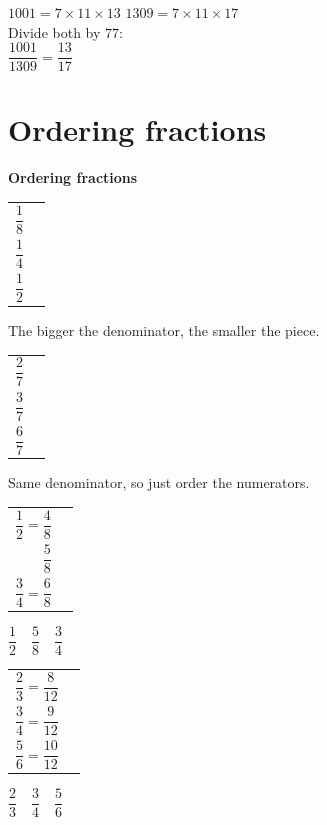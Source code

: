\documentclass[aspectratio=169]{beamer}
\makeatletter
\newcommand{\qtopic}[1]{%
  \section{#1}%
  \begin{frame}[plain]
    \vfill
    \begin{center}
      {\usebeamercolor[fg]{structure}\Huge\bfseries #1}
    \end{center}
    \vfill
  \end{frame}%
}
\newcommand{\barstack}[1]{%
  {\renewcommand{\arraystretch}{1.2}%
   \begin{tabular}{@{}r@{\;\;}l@{}}#1\end{tabular}}%
}
\makeatother
\begin{document}
  {$1001=7\times 11\times 13$ \qquad $1309=7\times 11\times 17$\\[0.4em]
   Divide both by $77$:\\[0.3em]
   $\dfrac{1001}{1309}=\dfrac{13}{17}$}

\qtopic{Ordering fractions}

  {\barstack{$\dfrac18$ & \fbar{8}{1} \\[0.95em]
             $\dfrac14$ & \fbar{4}{1} \\[0.95em]
             $\dfrac12$ & \fbar{2}{1}}
   \par\vspace{0.5em}
   The bigger the denominator, the smaller the piece.}

  {\barstack{$\dfrac27$ & \fbar{7}{2} \\[0.95em]
             $\dfrac37$ & \fbar{7}{3} \\[0.95em]
             $\dfrac67$ & \fbar{7}{6}}
   \par\vspace{0.5em}
   Same denominator, so just order the numerators.}

  {\barstack{$\dfrac12=\dfrac48$ & \fbar{8}{4} \\[0.95em]
             $\dfrac58$ & \fbar{8}{5} \\[0.95em]
             $\dfrac34=\dfrac68$ & \fbar{8}{6}}
   \par\vspace{0.5em}
   $\dfrac12\quad \dfrac58\quad \dfrac34$}

  {\barstack{$\dfrac23=\dfrac{8}{12}$ & \fbar{12}{8} \\[0.95em]
             $\dfrac34=\dfrac{9}{12}$ & \fbar{12}{9} \\[0.95em]
             $\dfrac56=\dfrac{10}{12}$ & \fbar{12}{10}}
   \par\vspace{0.5em}
   $\dfrac23\quad \dfrac34\quad \dfrac56$}
\end{document}
